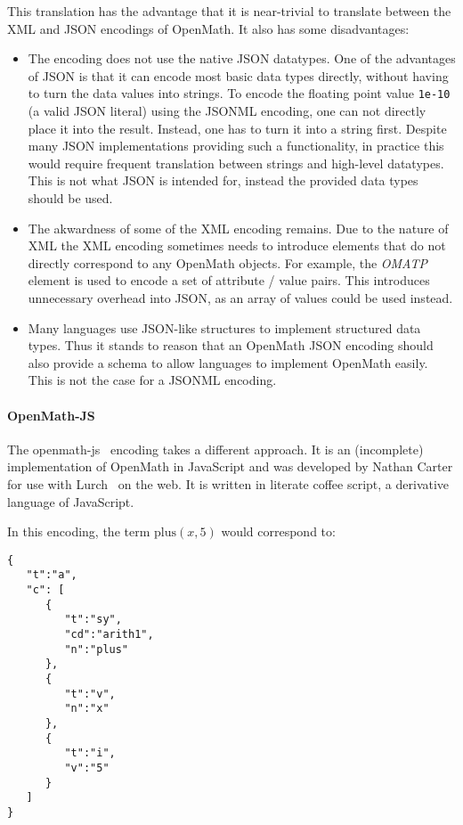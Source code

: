This translation has the advantage that it is near-trivial to translate between the XML and JSON encodings of OpenMath. 
It also has some disadvantages: 

\begin{itemize}
    \item The encoding does not use the native JSON datatypes. 
    One of the advantages of JSON is that it can encode most basic data types directly, without having to turn the data values into strings. 
    To encode the floating point value \lstinline{1e-10} (a valid JSON literal) using the JSONML encoding, one can not directly place it into the result. 
    Instead, one has to turn it into a string first.   
    Despite many JSON implementations providing such a functionality, in practice this would require frequent translation between strings and high-level datatypes.  
    This is not what JSON is intended for, instead the provided data types should be used. 

    \item The akwardness of some of the XML encoding remains. 
    Due to the nature of XML the XML encoding sometimes needs to introduce elements that do not directly correspond to any OpenMath objects. 
    For example, the \textit{OMATP} element is used to encode a set of attribute / value pairs. 
    This introduces unnecessary overhead into JSON, as an array of values could be used instead. 

    \item Many languages use JSON-like structures to implement structured data types. 
    Thus it stands to reason that an OpenMath JSON encoding should also provide a schema to allow languages to implement OpenMath easily. This is not the case for a JSONML encoding. 
\end{itemize}

\paragraph{OpenMath-JS}
The openmath-js~\cite{openmathjs:webpage} encoding takes a different approach. 
It is an (incomplete) implementation of OpenMath in JavaScript and was developed by Nathan Carter for use with Lurch~\cite{CarterMonks:OM:CICM-WS-WiP2013} on the web. 
It is written in literate coffee script, a derivative language of JavaScript. 

In this encoding, the term $\mathrm{plus}(x, 5)$ would correspond to: 
\begin{lstlisting}
{  
   "t":"a",
   "c": [  
      {  
         "t":"sy",
         "cd":"arith1",
         "n":"plus"
      },
      {  
         "t":"v",
         "n":"x"
      },
      {  
         "t":"i",
         "v":"5"
      }
   ]
}
\end{lstlisting}


